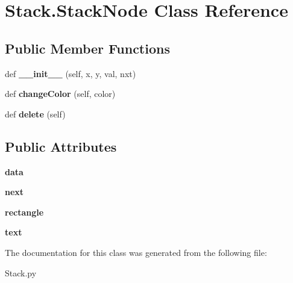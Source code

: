 \hypertarget{class_stack_1_1_stack_node}{}\section{Stack.\+Stack\+Node Class Reference}
\label{class_stack_1_1_stack_node}
\subsection*{Public Member Functions}
\begin{DoxyCompactItemize}
\item 
def {\bfseries \+\_\+\+\_\+init\+\_\+\+\_\+} (self, x, y, val, nxt)\hypertarget{class_stack_1_1_stack_node_a1f7436ddc8e865ddf238656418285920}{}\label{class_stack_1_1_stack_node_a1f7436ddc8e865ddf238656418285920}

\item 
def {\bfseries change\+Color} (self, color)\hypertarget{class_stack_1_1_stack_node_a01afb84c8c935287114b2d9bdf1d2491}{}\label{class_stack_1_1_stack_node_a01afb84c8c935287114b2d9bdf1d2491}

\item 
def {\bfseries delete} (self)\hypertarget{class_stack_1_1_stack_node_a96f87a002abf757eb12e5496f4c20eb4}{}\label{class_stack_1_1_stack_node_a96f87a002abf757eb12e5496f4c20eb4}

\end{DoxyCompactItemize}
\subsection*{Public Attributes}
\begin{DoxyCompactItemize}
\item 
{\bfseries data}\hypertarget{class_stack_1_1_stack_node_ae7e40c548b14d1cce9c061c7b657ae02}{}\label{class_stack_1_1_stack_node_ae7e40c548b14d1cce9c061c7b657ae02}

\item 
{\bfseries next}\hypertarget{class_stack_1_1_stack_node_a227a52319c27da780ff37649e3caf356}{}\label{class_stack_1_1_stack_node_a227a52319c27da780ff37649e3caf356}

\item 
{\bfseries rectangle}\hypertarget{class_stack_1_1_stack_node_a935a490cb8ef76ce8b2028ab77ba0bfc}{}\label{class_stack_1_1_stack_node_a935a490cb8ef76ce8b2028ab77ba0bfc}

\item 
{\bfseries text}\hypertarget{class_stack_1_1_stack_node_a29a49b0b74829df99922b1e5a364557a}{}\label{class_stack_1_1_stack_node_a29a49b0b74829df99922b1e5a364557a}

\end{DoxyCompactItemize}


The documentation for this class was generated from the following file\+:\begin{DoxyCompactItemize}
\item 
Stack.\+py\end{DoxyCompactItemize}
